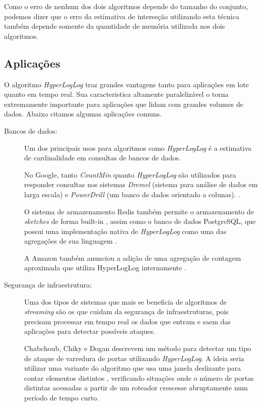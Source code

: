 Como o erro de nenhum dos dois algoritmos depende do tamanho do conjunto, podemos dizer que o erro da estimativa de interseção utilizando esta técnica também depende somente da quantidade de memória utilizada nos dois algoritmos.

\subsection{Aplicações}

O algoritmo \emph{HyperLogLog} traz grandes vantagens tanto para aplicações em lote quanto em tempo real. Sua caracteristica altamente paralelizável o torna extremamente importante para aplicações que lidam com grandes volumes de dados. Abaixo citamos algumas aplicações comuns.

\begin{description}

\item[Bancos de dados:]

Um dos principais usos para algoritmos como \emph{HyperLogLog} é a estimativa de cardinalidade em consultas de bancos de dados.

No Google, tanto \emph{CountMin} quanto \emph{HyperLogLog} são utilizados para responder consultas nos sistemas \emph{Dremel} (sistema para análise de dados em larga escala) e \emph{PowerDrill} (um banco de dados orientado a colunas). \cite{hall2012processing,melnik2010dremel,heule2013hyperloglog}.

O sistema de armazenamento Redis também permite o armazenamento de \emph{sketches} de forma built-in \cite{sindhu2015brief}, assim como o banco de dados PostgreSQL, que possui uma implementação nativa de \emph{HyperLogLog} como uma das agregações de sua linguagem \cite{chabchoub2014can}.

A Amazon também anunciou a adição de uma agregação de contagem aproximada que utiliza HyperLogLog internamente \cite{amazon2015hyperloglog}.

\item[Segurança de infraestrutura:]

Uma dos tipos de sistemas que mais se beneficia de algoritmos de \emph{streaming} são os que cuidam da segurança de infraestruturas, pois precisam processar em tempo real os dados que entram e saem das aplicações para detectar possíveis ataques.

Chabchoub, Chiky e Dogan \cite{chabchoub2014can} descrevem um método para detectar um tipo de ataque de varredura de portas utilizando \emph{HyperLogLog}. A ideia seria utilizar uma variante do algoritmo que usa uma janela deslizante para contar elementos distintos \cite{chabchoub2010sliding}, verificando situações onde o número de portas distintas acessadas a partir de um roteador crescesse abruptamente num período de tempo curto.


\end{description}
